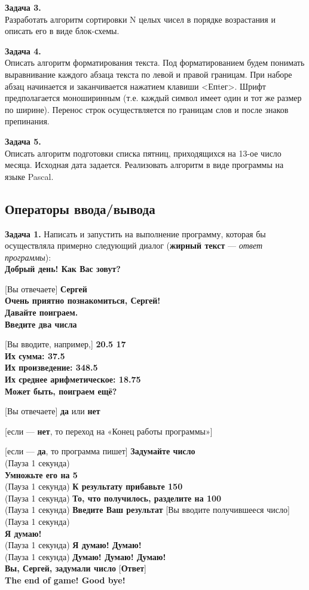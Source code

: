 {\bf Задача 3.}\\ 
Разработать алгоритм сортировки N целых чисел в порядке воз­растания и описать его в виде блок-схемы.

{\bf Задача 4.}\\ 
Описать алгоритм форматирования текста. Под форматированием будем понимать выравнивание каждого абзаца текста по левой и правой границам. При наборе абзац начинается и заканчивается нажатием клавиши <Епtег>. Шрифт предполагается моноширинным (т.е. каждый символ имеет один и тот же размер по ширине). Перенос строк осуществляется по границам слов и после знаков препинания.

{\bf Задача 5.}\\ 
Описать алгоритм подготовки списка пятниц, приходящихся на 13-ое число месяца. Исходная дата задается. Реализовать алго­ритм в виде программы на языке Pascal.

\subsection{Операторы ввода/вывода}

{\bf Задача 1.}
Написать и запустить на выполнение программу, которая бы осуществляла примерно следующий диалог ({\bf жирный текст} --- {\it ответ программы}):\\
{\bf Добрый день!  Как Вас зовут?}

  [Вы отвечаете] {\bf Сергей}\\
 {\bf Очень приятно познакомиться, Сергей! \\Давайте поиграем.}\\
 {\bf Введите два числа}
 
 [Вы вводите, например,]   {\bf 20.5 17}\\
 {\bf Их сумма: 37.5}\\
 {\bf Их произведение: 348.5}\\
 {\bf Их среднее арифметическое: 18.75}\\
 {\bf Может быть, поиграем ещё?}
 
[Вы отвечаете]  {\bf да}  или {\bf нет}

[если ---  {\bf нет},  то  переход на «Конец работы программы»]

[если ---  {\bf да}, то программа пишет] {\bf Задумайте число}\\
(Пауза 1 секунда)\\
 {\bf Умножьте его на 5}\\
(Пауза 1 секунда)  {\bf К результату прибавьте 150}\\
(Пауза 1 секунда)  {\bf То, что получилось, разделите на 100}\\
(Пауза 1 секунда)  {\bf Введите Ваш результат}  [Вы вводите получившееся число]\\
(Пауза 1 секунда)\\
 {\bf Я думаю!}\\
(Пауза 1 секунда)  {\bf Я думаю! Думаю!}\\
(Пауза 1 секунда)  {\bf Думаю! Думаю! Думаю!}\\
 {\bf Вы, Сергей, задумали число} [{\bf Ответ}]\\
 {\bf The end of game! Good bye!}\\

